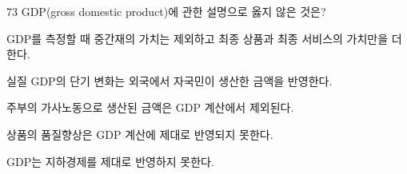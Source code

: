 \begin{question}{73}
GDP(gross domestic product)에 관한 설명으로 옳지 않은 것은?
\begin{choices}
  \item GDP를 측정할 때 중간재의 가치는 제외하고 최종 상품과 최종 서비스의 가치만을 더한다.
  \item 실질 GDP의 단기 변화는 외국에서 자국민이 생산한 금액을 반영한다.
  \item 주부의 가사노동으로 생산된 금액은 GDP 계산에서 제외된다.
  \item 상품의 품질향상은 GDP 계산에 제대로 반영되지 못한다.
  \item GDP는 지하경제를 제대로 반영하지 못한다.
\end{choices}
\end{question}

